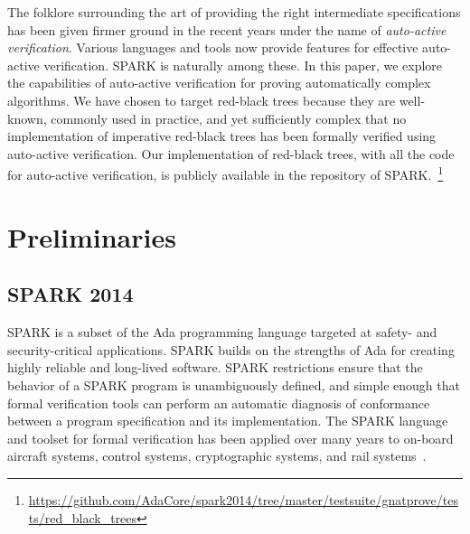 \documentclass{llncs}
\newcommand{\spark}{SPARK\xspace}
\begin{document}
The folklore surrounding the art of providing the right intermediate
specifications has been given firmer ground in the recent years under the name
of \emph{auto-active verification}. Various languages and tools now provide
features for effective auto-active verification. SPARK is naturally among
these. In this paper, we explore the capabilities of auto-active verification
for proving automatically complex algorithms. We have chosen to target
red-black trees because they are well-known, commonly used in practice, and yet
sufficiently complex that no implementation of imperative red-black trees has
been formally verified using auto-active verification. Our implementation of
red-black trees, with all the code for auto-active verification, is publicly
available in the repository of
SPARK.~\footnote{\url{https://github.com/AdaCore/spark2014/tree/master/testsuite/gnatprove/tests/red_black_trees}}




\section{Preliminaries}
\subsection{\spark 2014}

\spark is a subset of the Ada programming language targeted at safety-
and security-critical applications. \spark builds on the strengths of
Ada for creating highly reliable and long-lived software. \spark
restrictions ensure that the behavior of a \spark program is
unambiguously defined, and simple enough that formal verification
tools can perform an automatic diagnosis of conformance between a
program specification and its implementation. The \spark language and
toolset for formal verification has been applied over many years to
on-board aircraft systems, control systems, cryptographic systems, and
rail systems~\cite{oneill2012}.
\end{document}
